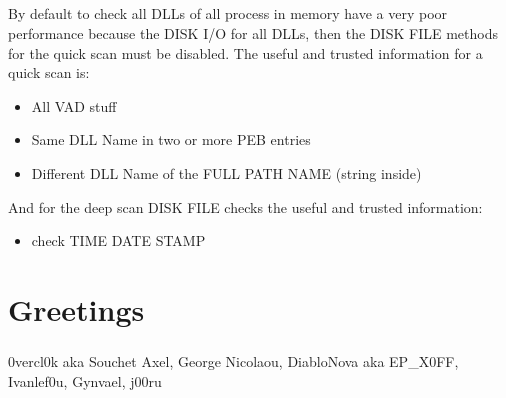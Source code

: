 \documentclass[12pt,a4paper,english]{book}
\newcommand{\paraph}{\paragraph{}}
\begin{document}
\paraph{}
By default to check all DLLs of all process in memory have a very poor performance because the DISK I/O for all DLLs, then the DISK FILE methods for the quick scan must be disabled. The useful and trusted information for a quick scan is:

{\bf
\begin{itemize}
\item { All VAD stuff }
\item { Same DLL Name in two or more PEB entries }
\item { Different DLL Name of the FULL PATH NAME (string inside) }
\end{itemize}
}
And for the deep scan DISK FILE checks the useful and trusted information:

{\bf
\begin{itemize}
\item { check TIME DATE STAMP }
\end{itemize}
}

\paraph{}

\chapter{Greetings}
\paraph{}
0vercl0k aka Souchet Axel, George Nicolaou, DiabloNova aka EP\_X0FF, Ivanlef0u, Gynvael, j00ru

\fancyhead[LE,RO]{}
\printbibliography[heading=bibintoc]

\clearpage
{}
\printindex
\end{document}
